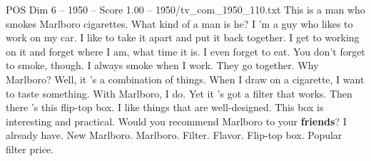 \begin{textsample}{POS Dim 6 – 1950 – Score 1.00 – 1950/tv\_com\_1950\_110.txt}  \label{ex:f6_pos_018}
This is a man who smokes Marlboro cigarettes.
What kind of a man is he?
I 'm a guy who likes to work on my car.
I like to take it apart and put it back together.
I get to working on it and forget where I am, what time it is.
I even forget to eat.
You don't forget to smoke, though.
I always smoke when I work.
They go together.
Why Marlboro?
Well, it 's a combination of things.
When I draw on a cigarette, I want to taste something.
With Marlboro, I do.
Yet it 's got a filter that works.
Then there 's this flip-top box.
I like things that are well-designed.
This box is interesting and practical.
Would you recommend Marlboro to your \textbf{friends}?
I already have.
New Marlboro.
Marlboro.
Filter.
Flavor.
Flip-top box.
Popular filter price.

\end{textsample}
